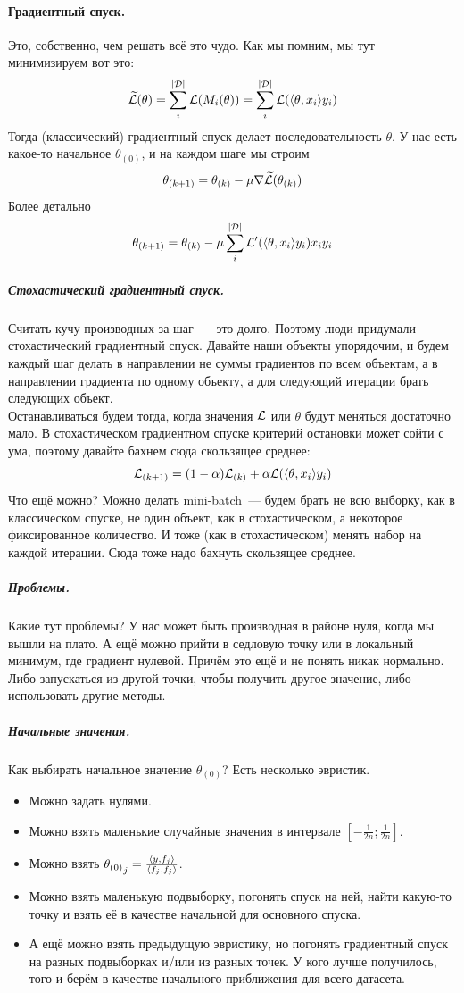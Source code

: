 \documentclass{article}
\begin{document}
    \paragraph{Градиентный спуск.}
    Это, собственно, чем решать всё это чудо. Как мы помним, мы тут минимизируем вот это:
    \[
    \widetilde{{\mathcal{L}}}(\theta)=\sum\limits_i^{|{\mathcal{D}}|}{\mathcal{L}}(M_i(\theta))=\sum\limits_i^{|{\mathcal{D}}|}{\mathcal{L}}({\left\langle{\theta},{x_i}\right\rangle}y_i)
    \]
    Тогда (классический) градиентный спуск делает последовательность $\theta$. У нас есть какое-то начальное $\theta_{(0)}$, и на каждом шаге мы строим
    \[
    \theta_{(k+1)}=\theta_{(k)}-\mu\nabla\widetilde{{\mathcal{L}}}(\theta_{(k)})
    \]
    Более детально
    \[
    \theta_{(k+1)}=\theta_{(k)}-\mu\sum\limits_i^{|{\mathcal{D}}|}{\mathcal{L}}'({\left\langle{\theta},{x_i}\right\rangle}y_i)x_iy_i
    \]
    \subparagraph{Стохастический градиентный спуск.}
    Считать кучу производных за шаг~--- это долго. Поэтому люди придумали стохастический градиентный спуск. Давайте наши объекты упорядочим, и будем каждый шаг делать в направлении не суммы градиентов по всем объектам, а в направлении градиента по одному объекту, а для следующий итерации брать следующих объект.\\
    Останавливаться будем тогда, когда значения ${\mathcal{L}}$ или $\theta$ будут меняться достаточно мало. В стохастическом градиентном спуске критерий остановки может сойти с ума, поэтому давайте бахнем сюда скользящее среднее:
    \[
    {\mathcal{L}}_{(k+1)}=(1-\alpha){\mathcal{L}}_{(k)}+\alpha{\mathcal{L}}({\left\langle{\theta},{x_i}\right\rangle}y_i)
    \]
    Что ещё можно? Можно делать mini-batch~--- будем брать не всю выборку, как в классическом спуске, не один объект, как в стохастическом, а некоторое фиксированное количество. И тоже (как в стохастическом) менять набор на каждой итерации. Сюда тоже надо бахнуть скользящее среднее.
    \subparagraph{Проблемы.}
    Какие тут проблемы? У нас может быть производная в районе нуля, когда мы вышли на плато. А ещё можно прийти в седловую точку или в локальный минимум, где градиент нулевой. Причём это ещё и не понять никак нормально. Либо запускаться из другой точки, чтобы получить другое значение, либо использовать другие методы.
    \subparagraph{Начальные значения.}
    Как выбирать начальное значение $\theta_{(0)}$? Есть несколько эвристик.
    \begin{itemize}
        \item Можно задать нулями.
        \item Можно взять маленькие случайные значения в интервале $\left[-\frac1{2n};\frac1{2n}\right]$.
        \item Можно взять ${\theta_{(0)}}_j=\frac{{\left\langle{y},{f_j}\right\rangle}}{{\left\langle{f_j},{f_j}\right\rangle}}$.
        \item Можно взять маленькую подвыборку, погонять спуск на ней, найти какую-то точку и взять её в качестве начальной для основного спуска.
        \item А ещё можно взять предыдущую эвристику, но погонять градиентный спуск на разных подвыборках и/или из разных точек. У кого лучше получилось, того и берём в качестве начального приближения для всего датасета.
    \end{itemize}
\end{document}
